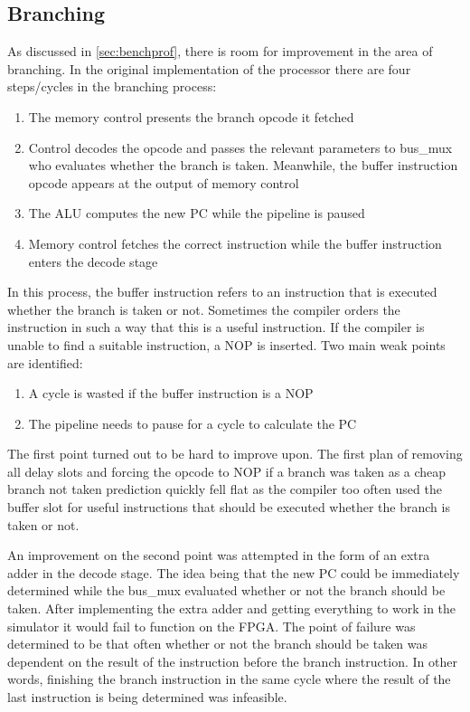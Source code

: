 \documentclass[final]{article}
\begin{document}
\subsection{Branching}
As discussed in \cref{sec:benchprof}, there is room for improvement in the area of branching.
In the original implementation of the processor there are four steps/cycles in the branching process:
\begin{enumerate}
\item The memory control presents the branch opcode it fetched
\item Control decodes the opcode and passes the relevant parameters to bus\_mux who evaluates whether the branch is taken. Meanwhile, the buffer instruction opcode appears at the output of memory control
\item The ALU computes the new PC while the pipeline is paused
\item Memory control fetches the correct instruction while the buffer instruction enters the decode stage
\end{enumerate}
In this process, the buffer instruction refers to an instruction that is executed whether the branch is taken or not.
Sometimes the compiler orders the instruction in such a way that this is a useful instruction.
If the compiler is unable to find a suitable instruction, a NOP is inserted.
Two main weak points are identified:
\begin{enumerate}
\item A cycle is wasted if the buffer instruction is a NOP
\item The pipeline needs to pause for a cycle to calculate the PC
\end{enumerate}
The first point turned out to be hard to improve upon.
The first plan of removing all delay slots and forcing the opcode to NOP if a branch was taken as a cheap branch not taken prediction quickly fell flat as the compiler too often used the buffer slot for useful instructions that should be executed whether the branch is taken or not.

An improvement on the second point was attempted in the form of an extra adder in the decode stage.
The idea being that the new PC could be immediately determined while the bus\_mux evaluated whether or not the branch should be taken.
After implementing the extra adder and getting everything to work in the simulator it would fail to function on the FPGA.
The point of failure was determined to be that often whether or not the branch should be taken was dependent on the result of the instruction before the branch instruction.
In other words, finishing the branch instruction in the same cycle where the result of the last instruction is being determined was infeasible. 
\end{document}
